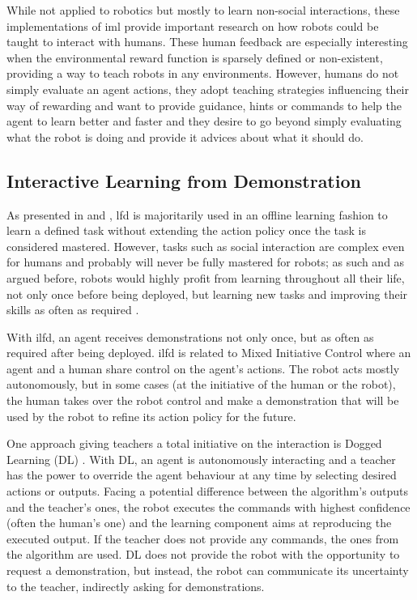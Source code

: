 While not applied to robotics but mostly to learn non-social interactions, these implementations of \gls{iml} provide important research on how robots could be taught to interact with humans. These human feedback are especially interesting when the environmental reward function is sparsely defined or non-existent, providing a way to teach robots in any environments. However, humans do not simply evaluate an agent actions, they adopt teaching strategies influencing their way of rewarding and want to provide guidance, hints or commands to help the agent to learn better and faster and they desire to go beyond simply evaluating what the robot is doing and provide it advices about what it should do.


\subsection{Interactive Learning from Demonstration} \label{ssec:back_ilfd}

As presented in \cite{argall2009survey} and \cite{billard2008robot}, \gls{lfd} is majoritarily used in an offline learning fashion to learn a defined task without extending the action policy once the task is considered mastered. However, tasks such as social interaction are complex even for humans and probably will never be fully mastered for robots; as such and as argued before, robots would highly profit from learning throughout all their life, not only once before being deployed, but learning new tasks and improving their skills as often as required \citep{dautenhahn2004robots}.

With \gls{ilfd}, an agent receives demonstrations not only once, but as often as required after being deployed. \gls{ilfd} is related to Mixed Initiative Control \citep{adams2004mixed} where an agent and a human share control on the agent's actions. The robot acts mostly autonomously, but in some cases (at the initiative of the human or the robot), the human takes over the robot control and make a demonstration that will be used by the robot to refine its action policy for the future.

One approach giving teachers a total initiative on the interaction is Dogged Learning (DL) \citep{grollman2007dogged}. With DL, an agent is autonomously interacting and a teacher has the power to override the agent behaviour at any time by selecting desired actions or outputs. Facing a potential difference between the algorithm's outputs and the teacher's ones, the robot executes the commands with highest confidence (often the human's one) and the learning component aims at reproducing the executed output. If the teacher does not provide any commands, the ones from the algorithm are used. DL does not provide the robot with the opportunity to request a demonstration, but instead, the robot can communicate its uncertainty to the teacher, indirectly asking for demonstrations. 

